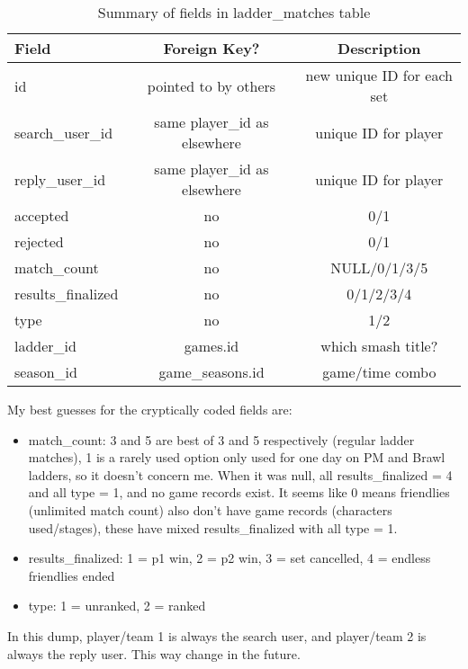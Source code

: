 \documentclass[12pt]{article}
\begin{document}
\begin{table}[]
  \caption{Summary of fields in ladder\_matches table}
  \label{tab:ladder matches}
  \centering

  \begin{tabular}{l|cc}
  \hline

  \hline
  \textbf{Field} & \textbf{Foreign Key?} & \textbf{Description} \\
  \hline
    id & pointed to by others & new unique ID for each set \\
    search\_user\_id & same player\_id as elsewhere & unique ID for player \\
    reply\_user\_id & same player\_id as elsewhere & unique ID for player \\
    accepted & no & 0/1 \\
    rejected & no & 0/1 \\
    match\_count & no & NULL/0/1/3/5\\
    results\_finalized & no & 0/1/2/3/4 \\
    type & no & 1/2 \\
    ladder\_id & games.id & which smash title? \\
    season\_id & game\_seasons.id & game/time combo \\
  \hline

  \hline
  \end{tabular}
\end{table}

My best guesses for the cryptically coded fields are: 
\begin{itemize}
  \item match\_count: 3 and 5 are best of 3 and 5 respectively (regular ladder matches), 1 is a rarely used option only used for one day on PM and Brawl ladders, so it doesn't concern me. When it was null, all results\_finalized = 4 and all type = 1, and no game records exist. It seems like 0 means friendlies (unlimited match count) also don't have game records (characters used/stages), these have mixed results\_finalized with all type = 1.
  \item results\_finalized: 1 = p1 win, 2 = p2 win, 3 = set cancelled, 4 = endless friendlies ended
  \item type: 1 = unranked, 2 = ranked
\end{itemize}

In this dump, player/team 1 is always the search user, and player/team 2 is always the reply user. This way change in the future.
\end{document}
